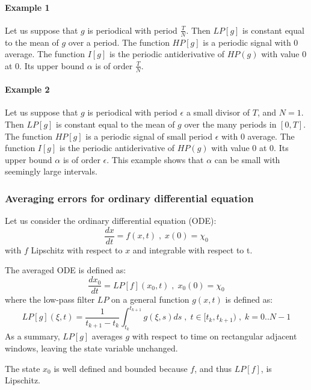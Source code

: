 \documentclass[a4paper,10pt]{article}
\begin{document}
\paragraph{Example 1}
Let us suppose that $g$ is periodical with period $\frac{T}{N}$.
Then $LP[g]$ is constant equal to the mean of $g$ over a period.
The function $HP[g]$ is a periodic signal with $0$ average.
The function $I[g]$ is the periodic antiderivative of $HP(g)$ with 
value $0$ at $0$. Its upper bound $\alpha$ is of order $\frac{T}{N}$.
\paragraph{Example 2}
Let us suppose that $g$ is periodical with period $\epsilon$ a small 
divisor of $T$, and $N=1$. Then $LP[g]$ is constant equal to the 
mean of $g$ over the many periods in $[0,T]$.
The function $HP[g]$ is a periodic signal of small period $\epsilon$ with $0$ average.
The function $I[g]$ is the periodic antiderivative  of $HP(g)$ with 
value $0$ at $0$. Its upper bound $\alpha$ is of order $\epsilon$.
This example shows that $\alpha$ can be small with  seemingly large 
intervals.


\subsubsection{Averaging errors for ordinary differential equation}
Let us consider the ordinary differential equation (ODE):
\begin{equation}
    \frac{dx}{dt}=f(x,t) \; , \; x(0)=\chi_{0}
    \label{ODE}
\end{equation}
with $f$ Lipschitz with respect to $x$ and integrable with respect to 
t.


The averaged ODE is defined as:
\begin{equation}
    \frac{dx_{0}}{dt}=LP[f](x_{0},t) \; , \; x_{0}(0)=\chi_{0}
    \label{aveODE}
\end{equation}
where the low-pass filter $LP$ on a general function $g(x,t)$ is defined as:
\begin{equation}
   LP[g](\xi,t)  =  \frac{1}{t_{k+1}-t_{k}} 
    \int_{t_{k}}^{t_{k+1}}g(\xi,s)ds
    \; , \;  t \in [t_{k},t_{k+1}) \; , \; k=0..N-1
    \label{avedDynODE}
\end{equation}
As a summary, $LP[g]$ averages $g$ with respect to time on rectangular adjacent 
windows, leaving the state variable unchanged.

The state $x_{0}$ is well defined and bounded because $f$, and thus 
$LP[f]$, is Lipschitz.
\end{document}
